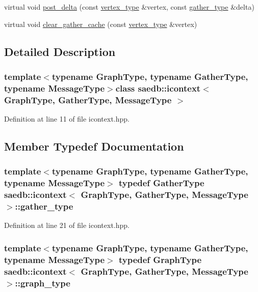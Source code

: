 \begin{DoxyCompactItemize}
\item 
virtual void \hyperlink{classsaedb_1_1icontext_a6a962eb1911f3e35f6f843213dfdc857}{post\-\_\-delta} (const \hyperlink{classsaedb_1_1icontext_ab83a38ba860cb2101b499ae60675e4e5}{vertex\-\_\-type} \&vertex, const \hyperlink{classsaedb_1_1icontext_a7c3ae1019b418faf3de68ab9396f867b}{gather\-\_\-type} \&delta)
\item 
virtual void \hyperlink{classsaedb_1_1icontext_a327a0e7c8b3b040abb577715e1844c14}{clear\-\_\-gather\-\_\-cache} (const \hyperlink{classsaedb_1_1icontext_ab83a38ba860cb2101b499ae60675e4e5}{vertex\-\_\-type} \&vertex)
\end{DoxyCompactItemize}


\subsection{Detailed Description}
\subsubsection*{template$<$typename Graph\-Type, typename Gather\-Type, typename Message\-Type$>$class saedb\-::icontext$<$ Graph\-Type, Gather\-Type, Message\-Type $>$}



Definition at line 11 of file icontext.\-hpp.



\subsection{Member Typedef Documentation}
\hypertarget{classsaedb_1_1icontext_a7c3ae1019b418faf3de68ab9396f867b}{
\subsubsection[{gather\-\_\-type}]{\setlength{\rightskip}{0pt plus 5cm}template$<$typename Graph\-Type, typename Gather\-Type, typename Message\-Type$>$ typedef Gather\-Type {\bf saedb\-::icontext}$<$ Graph\-Type, Gather\-Type, Message\-Type $>$\-::{\bf gather\-\_\-type}}}\label{d6/d73/classsaedb_1_1icontext_a7c3ae1019b418faf3de68ab9396f867b}


Definition at line 21 of file icontext.\-hpp.

\hypertarget{classsaedb_1_1icontext_a8eeb99ff6eb90e3f096a2895f9b92653}{
\subsubsection[{graph\-\_\-type}]{\setlength{\rightskip}{0pt plus 5cm}template$<$typename Graph\-Type, typename Gather\-Type, typename Message\-Type$>$ typedef Graph\-Type {\bf saedb\-::icontext}$<$ Graph\-Type, Gather\-Type, Message\-Type $>$\-::{\bf graph\-\_\-type}}}\label{d6/d73/classsaedb_1_1icontext_a8eeb99ff6eb90e3f096a2895f9b92653}


